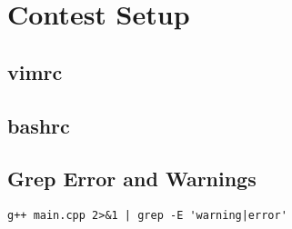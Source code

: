 \documentclass[10pt,oneside]{article}
\begin{document}
 

\begin{landscape}
\begin{multicols}{2}


\pagestyle{fancy}
\fancyhead[R]{\thepage}
\fancyfoot[R]{\thepage}

{
\fancyhead[R]{\thepage}
\fancyfoot[R]{\thepage}
}

\scriptsize
\tableofcontents
\pagestyle{fancy}

\vfill



\section{Contest Setup}

\subsection{vimrc}


\subsection{bashrc}


\subsection{Grep Error and Warnings}

\begin{lstlisting}
g++ main.cpp 2>&1 | grep -E 'warning|error'
\end{lstlisting}


\end{multicols}
\end{landscape}
\end{document}
